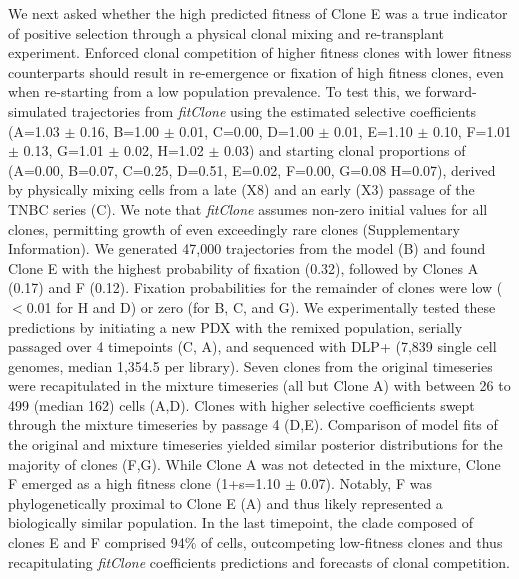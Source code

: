 We next asked whether the high predicted fitness of Clone E was a true indicator of positive selection through a physical clonal mixing and re-transplant experiment. Enforced clonal competition of higher fitness clones with lower fitness counterparts should result in re-emergence or fixation of high fitness clones, even when re-starting from a low population prevalence. To test this, we forward-simulated trajectories from \textit{fitClone} using the estimated selective coefficients (A=1.03 $\pm$ 0.16, B=1.00 $\pm$ 0.01, C=0.00,  D=1.00 $\pm$ 0.01, E=1.10 $\pm$ 0.10, F=1.01 $\pm$ 0.13, G=1.01 $\pm$ 0.02, H=1.02 $\pm$ 0.03) and starting clonal proportions of (A=0.00, B=0.07, C=0.25, D=0.51, E=0.02, F=0.00, G=0.08 H=0.07), derived by physically mixing cells from a late (X8) and an early (X3) passage  of the TNBC series (C). We note that \textit{fitClone} assumes non-zero initial values for all clones, permitting growth of even exceedingly rare clones (Supplementary Information). We generated 47,000 trajectories from the model (B) and found Clone E with the highest probability of fixation (0.32), followed by Clones A (0.17) and F (0.12). Fixation probabilities for the remainder of clones were low ($<$0.01 for H and D) or zero (for B, C, and G). We experimentally tested these predictions by initiating a new PDX with the remixed population, serially passaged over 4 timepoints (C, A), and sequenced with DLP+ (7,839 single cell genomes, median 1,354.5 per library). Seven clones from the original timeseries were recapitulated in the mixture timeseries (all but Clone A) with between 26 to 499 (median 162) cells (A,D). Clones with higher selective coefficients swept through the mixture timeseries by passage 4 (D,E). Comparison of model fits of the original and mixture timeseries yielded similar posterior distributions for the majority of clones (F,G). While Clone A was not detected in the mixture, Clone F emerged as a high fitness clone (1+s=1.10 $\pm$ 0.07). Notably, F was phylogenetically proximal to Clone E (A) and thus likely represented a biologically similar population. In the last timepoint, the clade composed of clones E and F comprised 94\% of cells, outcompeting low-fitness clones and thus recapitulating \textit{fitClone} coefficients predictions and forecasts of clonal competition.

